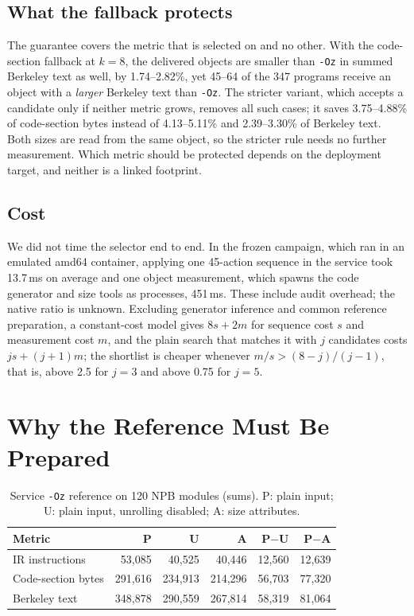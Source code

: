 \documentclass[conference,a4paper]{IEEEtran}
\begin{document}
\subsection{What the fallback protects}
The guarantee covers the metric that is selected on and no other. With
the code-section fallback at $k{=}8$, the delivered objects are smaller
than \texttt{-Oz} in summed Berkeley text as well, by 1.74--2.82\%, yet
45--64 of the 347 programs receive an object with a \emph{larger}
Berkeley text than \texttt{-Oz}. The stricter variant, which accepts a
candidate only if neither metric grows, removes all such cases; it
saves 3.75--4.88\% of code-section bytes instead of 4.13--5.11\% and
2.39--3.30\% of Berkeley text. Both sizes are read from the same object,
so the stricter rule needs no further measurement. Which metric should
be protected depends on the deployment target, and neither is a linked
footprint.

\subsection{Cost}
We did not time the selector end to end. In the frozen campaign, which
ran in an emulated amd64 container, applying one 45-action sequence in
the service took 13.7\,ms on average and one object measurement, which
spawns the code generator and size tools as processes, 451\,ms.
These include audit overhead; the native ratio is unknown. Excluding
generator inference and common reference preparation, a constant-cost
model gives $8s+2m$ for sequence cost $s$ and
measurement cost $m$, and the plain search that matches it with $j$
candidates costs $js+(j{+}1)m$; the shortlist is cheaper whenever
$m/s>(8{-}j)/(j{-}1)$, that is, above 2.5 for $j{=}3$ and above 0.75 for
$j{=}5$.

\section{Why the Reference Must Be Prepared}
\label{sec:causal}
\begin{table}[t]
\caption{Service \texttt{-Oz} reference on 120 NPB modules (sums).
P: plain input; U: plain input, unrolling disabled; A: size
attributes.}
\label{tab:causal}
\centering
\footnotesize
\setlength{\tabcolsep}{3.5pt}
\begin{tabular}{lrrrrr}
\toprule
Metric & P & U & A & P$-$U & P$-$A \\
\midrule
IR instructions    & 53,085  & 40,525  & 40,446  & 12,560 & 12,639 \\
Code-section bytes & 291,616 & 234,913 & 214,296 & 56,703 & 77,320 \\
Berkeley text      & 348,878 & 290,559 & 267,814 & 58,319 & 81,064 \\
\bottomrule
\end{tabular}
\end{table}
\end{document}
